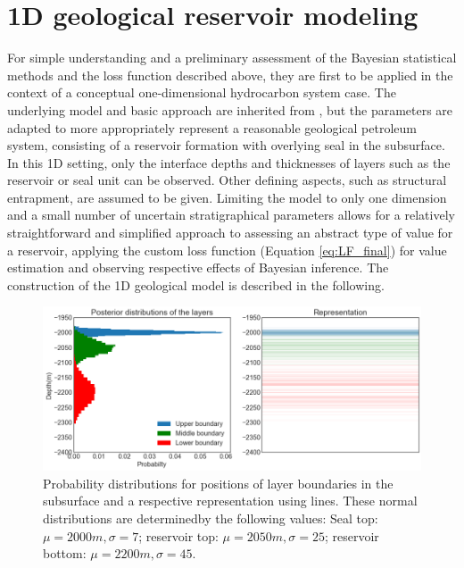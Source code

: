 		\section{1D geological reservoir modeling}\label{sec:1D_model}
		For simple understanding and a preliminary assessment of the Bayesian statistical methods and the loss function described above, they are first to be applied in the context of a conceptual one-dimensional hydrocarbon system case. The underlying model and basic approach are inherited from \citet{delaVarga2016}, but the parameters are adapted to more appropriately represent a reasonable geological petroleum system, consisting of a reservoir formation with overlying seal in the subsurface. In this 1D setting, only the interface depths and thicknesses of layers such as the reservoir or seal unit can be observed. Other defining aspects, such as structural entrapment, are assumed to be given. Limiting the model to only one dimension and a small number of uncertain stratigraphical parameters allows for a relatively straightforward and simplified approach to assessing an abstract type of value for a reservoir, applying the custom loss function (Equation \ref{eq:LF_final}) for value estimation and observing respective effects of Bayesian inference. The construction of the 1D geological model is described in the following.
			\begin{figure}[h]
				\centering
				\includegraphics[width=1\textwidth]{Figures/1D_model.png}
				\caption{Probability distributions for positions of layer boundaries in the subsurface and a respective representation using lines. These normal distributions are determinedby the following values: Seal top: $\mu = 2000 m, \sigma = 7$; reservoir top: $\mu = 2050 m, \sigma = 25$; reservoir bottom: $\mu = 2200 m, \sigma = 45$. }\label{fig:1D_model}
			\end{figure}
